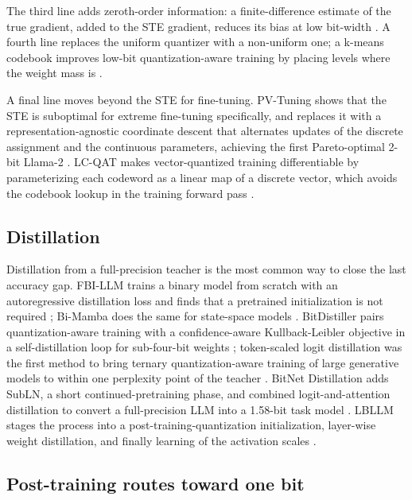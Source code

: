 \documentclass[11pt]{article}
\begin{document}
The third line adds zeroth-order information: a finite-difference estimate of the true
gradient, added to the STE gradient, reduces its bias at low bit-width
\cite{Anon2025-STE-ZerothOrder}. A fourth line replaces the uniform quantizer with a
non-uniform one; a k-means codebook improves low-bit quantization-aware training by
placing levels where the weight mass is \cite{Maskey2026-1BitWonder}.

A final line moves beyond the STE for fine-tuning. PV-Tuning shows that the STE is
suboptimal for extreme fine-tuning specifically, and replaces it with a
representation-agnostic coordinate descent that alternates updates of the discrete
assignment and the continuous parameters, achieving the first Pareto-optimal 2-bit
Llama-2 \cite{Malinovskii2024-PVTuning}. LC-QAT makes vector-quantized training
differentiable by parameterizing each codeword as a linear map of a discrete vector,
which avoids the codebook lookup in the training forward pass \cite{Wang2026-LCQAT}.

\subsection{Distillation}

Distillation from a full-precision teacher is the most common way to close the last
accuracy gap. FBI-LLM trains a binary model from scratch with an autoregressive
distillation loss and finds that a pretrained initialization is not required
\cite{Ma2024-FBILLM}; Bi-Mamba does the same for state-space models \cite{Tang2024-BiMamba}.
BitDistiller pairs quantization-aware training with a confidence-aware
Kullback-Leibler objective in a self-distillation loop for sub-four-bit weights
\cite{Du2024-BitDistiller}; token-scaled logit distillation was the first method to bring
ternary quantization-aware training of large generative models to within one perplexity
point of the teacher \cite{Kim2023-TSLD}. BitNet Distillation adds SubLN, a short
continued-pretraining phase, and combined logit-and-attention distillation to convert a
full-precision LLM into a 1.58-bit task model \cite{Wu2025-BitNetDistillation}. LBLLM stages
the process into a post-training-quantization initialization, layer-wise weight
distillation, and finally learning of the activation scales \cite{Song2026-LBLLM}.

\subsection{Post-training routes toward one bit}
\end{document}
